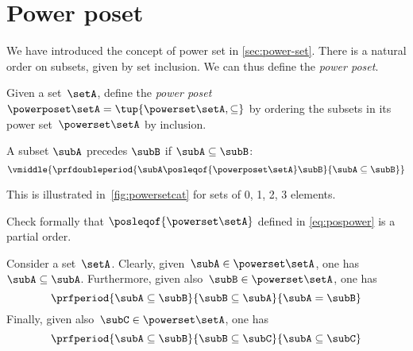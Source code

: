 \section{Power poset}

We have introduced the concept of power set in \cref{sec:power-set}.
There is a natural order on subsets, given by set inclusion.
We can thus define the \emph{power poset}.

\begin{definition}
    \label{def:power-poset}
    Given a set~$\setA$,
    define the \emph{power poset} $\powerposet\setA = \tup{\powerset\setA,\subseteq}$ by ordering the subsets in its power set~$\powerset\setA$ by inclusion.

    A subset $\subA$ precedes $\subB$ if $\subA \subseteq \subB$:
    \begin{equation}\label{eq:pospower}
        \vmiddle{
            \prfdoubleperiod{
                \subA \posleqof{\powerposet\setA} \subB
            }{
                \subA \subseteq \subB
            }
        }
    \end{equation}
\end{definition}
This is illustrated in~\cref{fig:powersetcat} for sets of 0, 1, 2, 3 elements.
\begin{exercise}
    Check formally that $\posleqof{\powerset\setA}$ defined in \cref{eq:pospower} is a partial order.
\end{exercise}
\begin{solution}
    Consider a set~$\setA$.
    Clearly, given~$\subA\in \powerset \setA$, one has~$\subA\subseteq \subA$.
    Furthermore, given also~$\subB\in \powerset \setA$, one has
    \begin{equation*}
        \prfperiod{\subA\subseteq \subB}{\subB\subseteq \subA}{\subA=\subB}
    \end{equation*}
    Finally, given also~$\subC\in \powerset \setA$, one has
    \begin{equation*}
        \prfperiod{\subA\subseteq \subB}{\subB\subseteq \subC}{\subA\subseteq\subC}
    \end{equation*}
\end{solution}
\vfill
\begin{figure*}[h]
    \centering
    \hfill
    \hfill
    \hfill
    \caption{Power set as a poset.
    }
    \label{fig:powersetcat}
\end{figure*}\
\vfill
